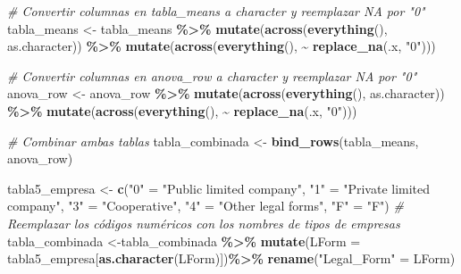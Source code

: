 \documentclass[
]{article}
\newenvironment{Shaded}{\begin{snugshade}}{\end{snugshade}}
\newcommand{\AttributeTok}[1]{\textcolor[rgb]{0.13,0.29,0.53}{#1}}
\newcommand{\CommentTok}[1]{\textcolor[rgb]{0.56,0.35,0.01}{\textit{#1}}}
\newcommand{\FunctionTok}[1]{\textcolor[rgb]{0.13,0.29,0.53}{\textbf{#1}}}
\newcommand{\NormalTok}[1]{#1}
\newcommand{\OtherTok}[1]{\textcolor[rgb]{0.56,0.35,0.01}{#1}}
\newcommand{\SpecialCharTok}[1]{\textcolor[rgb]{0.81,0.36,0.00}{\textbf{#1}}}
\newcommand{\StringTok}[1]{\textcolor[rgb]{0.31,0.60,0.02}{#1}}
\begin{document}
\begin{Shaded}
\begin{Highlighting}[]
\CommentTok{\# Convertir columnas en tabla\_means a character y reemplazar NA por "0"}
\NormalTok{tabla\_means }\OtherTok{\textless{}{-}}\NormalTok{ tabla\_means }\SpecialCharTok{\%\textgreater{}\%}
  \FunctionTok{mutate}\NormalTok{(}\FunctionTok{across}\NormalTok{(}\FunctionTok{everything}\NormalTok{(), as.character)) }\SpecialCharTok{\%\textgreater{}\%}
  \FunctionTok{mutate}\NormalTok{(}\FunctionTok{across}\NormalTok{(}\FunctionTok{everything}\NormalTok{(), }\SpecialCharTok{\textasciitilde{}} \FunctionTok{replace\_na}\NormalTok{(.x, }\StringTok{"0"}\NormalTok{)))}

\CommentTok{\# Convertir columnas en anova\_row a character y reemplazar NA por "0"}
\NormalTok{anova\_row }\OtherTok{\textless{}{-}}\NormalTok{ anova\_row }\SpecialCharTok{\%\textgreater{}\%}
  \FunctionTok{mutate}\NormalTok{(}\FunctionTok{across}\NormalTok{(}\FunctionTok{everything}\NormalTok{(), as.character)) }\SpecialCharTok{\%\textgreater{}\%}
  \FunctionTok{mutate}\NormalTok{(}\FunctionTok{across}\NormalTok{(}\FunctionTok{everything}\NormalTok{(), }\SpecialCharTok{\textasciitilde{}} \FunctionTok{replace\_na}\NormalTok{(.x, }\StringTok{"0"}\NormalTok{)))}

\CommentTok{\# Combinar ambas tablas}
\NormalTok{tabla\_combinada }\OtherTok{\textless{}{-}} \FunctionTok{bind\_rows}\NormalTok{(tabla\_means, anova\_row)}


\NormalTok{tabla5\_empresa }\OtherTok{\textless{}{-}} \FunctionTok{c}\NormalTok{(}\StringTok{"0"} \OtherTok{=} \StringTok{"Public limited company"}\NormalTok{, }
                    \StringTok{"1"} \OtherTok{=} \StringTok{"Private limited company"}\NormalTok{, }
                    \StringTok{"3"} \OtherTok{=} \StringTok{"Cooperative"}\NormalTok{, }
                    \StringTok{"4"} \OtherTok{=} \StringTok{"Other legal forms"}\NormalTok{,}
                    \StringTok{"F"} \OtherTok{=} \StringTok{"F"}\NormalTok{)}
\CommentTok{\# Reemplazar los códigos numéricos con los nombres de tipos de empresas}
\NormalTok{tabla\_combinada }\OtherTok{\textless{}{-}}\NormalTok{tabla\_combinada }\SpecialCharTok{\%\textgreater{}\%}
  \FunctionTok{mutate}\NormalTok{(}\AttributeTok{LForm =}\NormalTok{ tabla5\_empresa[}\FunctionTok{as.character}\NormalTok{(LForm)])}\SpecialCharTok{\%\textgreater{}\%} 
  \FunctionTok{rename}\NormalTok{(}\StringTok{"Legal\_Form"} \OtherTok{=}\NormalTok{ LForm)}
\end{Highlighting}
\end{Shaded}
\end{document}
